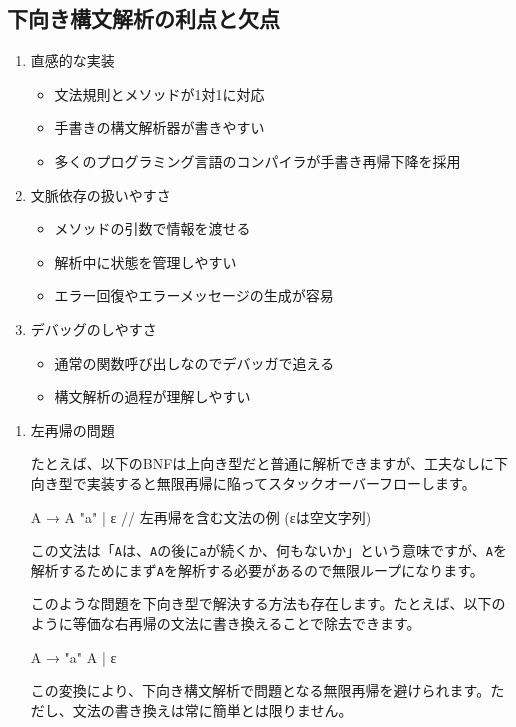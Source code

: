 \subsection{下向き構文解析の利点と欠点}


\begin{enumerate}
\item
  直感的な実装

\begin{itemize}
\item
  文法規則とメソッドが1対1に対応
\item
  手書きの構文解析器が書きやすい
\item
  多くのプログラミング言語のコンパイラが手書き再帰下降を採用
\end{itemize}

\item
  文脈依存の扱いやすさ

\begin{itemize}
\item
  メソッドの引数で情報を渡せる
\item
  解析中に状態を管理しやすい
\item
  エラー回復やエラーメッセージの生成が容易
\end{itemize}

\item
  デバッグのしやすさ

\begin{itemize}
\item
  通常の関数呼び出しなのでデバッガで追える
\item
  構文解析の過程が理解しやすい
\end{itemize}
\end{enumerate}


\begin{enumerate}
\item
  左再帰の問題

たとえば、以下のBNFは上向き型だと普通に解析できますが、工夫なしに下向き型で実装すると無限再帰に陥ってスタックオーバーフローします。

\begin{codescreen}{}
A → A "a" | ε // 左再帰を含む文法の例 (εは空文字列)
\end{codescreen}

この文法は「\texttt{A}は、\texttt{A}の後に\texttt{a}が続くか、何もないか」という意味ですが、\texttt{A}を解析するためにまず\texttt{A}を解析する必要があるので無限ループになります。

このような問題を下向き型で解決する方法も存在します。たとえば、以下のように等価な右再帰の文法に書き換えることで除去できます。

\begin{codescreen}{}
A → "a" A | ε
\end{codescreen}

この変換により、下向き構文解析で問題となる無限再帰を避けられます。ただし、文法の書き換えは常に簡単とは限りません。
\end{enumerate}

